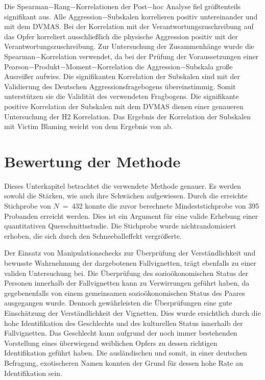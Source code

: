 Die Spearman$-$Rang$-$Korrelationen der Post$-$hoc Analyse fiel größtenteils signifikant aus. Alle Aggression$-$Subskalen korrelieren positiv untereinander und mit dem DVMAS. Bei der Korrelation mit der Verantwortungszuschreibung auf das Opfer korreliert ausschließlich die physische Aggression positiv mit der Verantwortungszuschreibung. Zur Untersuchung der Zusammenhänge wurde die Spearman$-$Korrelation verwendet, da bei der Prüfung der Voraussetzungen einer Pearson$-$Produkt$-$Moment$-$Korrelation die Aggression$-$Subskala große Ausreißer aufwies. Die signifikanten Korrelation der Subskalen sind mit der Validierung des Deutschen Aggressionsfragebogens \parencite{Aggressionsfragebogen} übereinstimmig. Somit unterstützen sie die Validität des verwendeten Fragbogens. Die signifikante positive Korrelation der Subskalen mit dem DVMAS dienen einer genaueren Untersuchung der H2 Korrelation. Das Ergebnis der Korrelation der Subskalen mit Victim Blaming weicht von dem Ergebnis von \textcite{H1_moderation_2020} ab. 


\section{Bewertung der Methode}   \label{sec_5.3}
Dieses Unterkapitel betrachtet die verwendete Methode genauer. Es werden sowohl die Stärken, wie auch ihre Schwächen aufgewiesen.
Durch die erreichte Stichprobe von $N$~=~432 konnte die zuvor berechnete Mindeststichprobe von 395 Probanden erreicht werden. Dies ist ein Argument für eine valide Erhebung einer quantitativen Querschnittsstudie. Die Stichprobe wurde nichtrandomisiert erhoben, die sich durch den Schneeballeffekt vergrößerte.

Der Einsatz von Manipulationschecks zur Überprüfung der Verständlichkeit und bewusste Wahrnehmung der dargebotenen Fallvignetten, trägt ebenfalls zu einer validen Untersuchung bei. Die Überprüfung des sozioökonomischen Status der Personen innerhalb der Fallvignetten kann zu Verwirrungen geführt haben, da gegebenenfalls von einem gemeinsamen sozioökonomischen Status des Paares ausgegangen wurde. Dennoch gewährleisten die Überprüfungen eine gute Einschätzung der Verständlichkeit der Vignetten. Dies wurde ersichtlich durch die hohe Identifikation des Geschlechts und des kulturellen Status innerhalb der Fallvignetten. Das Geschlecht kann aufgrund der noch immer bestehenden Vorstellung eines überwiegend weiblichen Opfers zu dessen richtigen Identifikation geführt haben. Die ausländischen und somit, in einer deutschen Befragung, exotischeren Namen konnten der Grund für dessen hohe Rate an Identifikation sein.


